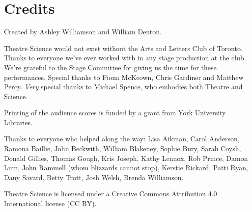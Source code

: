 
\newpageforperformers{}

\section{Credits}

Created by Ashley Williamson and William Denton.

Theatre Science would not exist without the Arts and Letters Club of Toronto.  Thanks to everyone we've ever worked with in any stage production at the club.  We're grateful to the Stage Committee for giving us the time for these performances. Special thanks to Fiona McKeown, Chris Gardiner and Matthew Percy.  \textit{Very} special thanks to Michael Spence, who embodies both Theatre and Science.

Printing of the audience scores is funded by a grant from York University Libraries.

Thanks to everyone who helped along the way:  Lisa Aikman, Carol Anderson, Ramona Baillie, John Beckwith, William Blakeney, Sophie Bury, Sarah Coysh, Donald Gillies, Thomas Gough, Kris Joseph, Kathy Lennox, Rob Prince, Damon Lum, John Rammell (whom blizzards cannot stop), Kerstie Rickard, Patti Ryan, Dany Savard, Betty Trott, Josh Welsh, Brenda Williamson.

Theatre Science is licensed under a Creative Commons Attribution 4.0 International license (CC BY).  %
